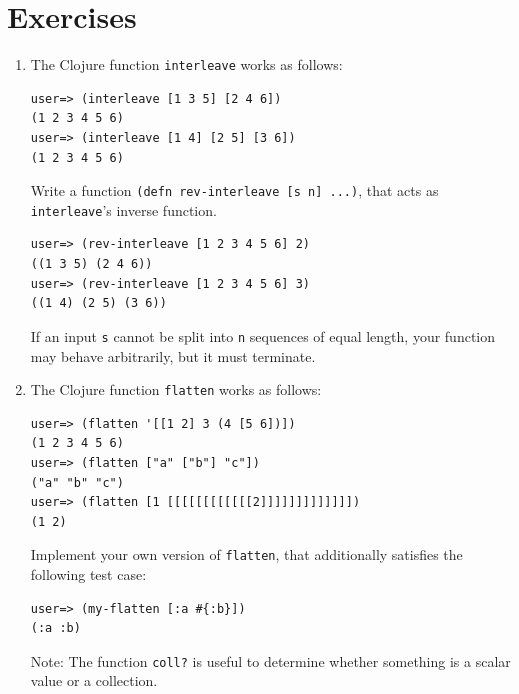 \documentclass[11pt,a4paper]{article}
\begin{document}
\section{Exercises}

\begin{exercise}[Functions]
\begin{enumerate}[label=\alph*)]
\item The Clojure function \texttt{interleave} works as follows:
\begin{verbatim}
user=> (interleave [1 3 5] [2 4 6])
(1 2 3 4 5 6)
user=> (interleave [1 4] [2 5] [3 6])
(1 2 3 4 5 6)
\end{verbatim}

Write a function \texttt{(defn rev-interleave [s n] ...)}, that acts as \texttt{interleave}'s inverse function. 
\begin{verbatim}
user=> (rev-interleave [1 2 3 4 5 6] 2)
((1 3 5) (2 4 6))
user=> (rev-interleave [1 2 3 4 5 6] 3)
((1 4) (2 5) (3 6))
\end{verbatim}

If an input \texttt{s} cannot be split into \texttt{n} sequences of equal length, your function may behave arbitrarily, but it must terminate.
\item The Clojure function \texttt{flatten} works as follows:
\begin{verbatim}
user=> (flatten '[[1 2] 3 (4 [5 6])])
(1 2 3 4 5 6)
user=> (flatten ["a" ["b"] "c"])
("a" "b" "c")
user=> (flatten [1 [[[[[[[[[[[[2]]]]]]]]]]]]])
(1 2)
\end{verbatim}
Implement your own version of \texttt{flatten}, that additionally satisfies the following test case:
\begin{verbatim}
user=> (my-flatten [:a #{:b}])
(:a :b)
\end{verbatim}

Note: The function \verb|coll?| is useful to determine whether something is a scalar value or a collection.


\end{enumerate}

\end{exercise}
\end{document}
